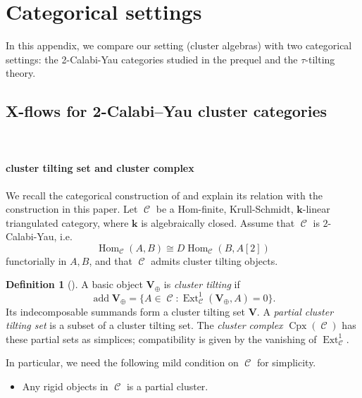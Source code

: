 \documentclass[11pt,reqno]{amsart}
\theoremstyle{plain}
\theoremstyle{definition}
\newtheorem{definition}[theorem]{Definition}
\numberwithin{equation}{section}
\newcommand\hua{\mathcal}
\newcommand\<{\langle}
\renewcommand\>{\rangle}
\newcommand\Add{\operatorname{add}}
\newcommand\Hom{\operatorname{Hom}}
\newcommand\Ext{\operatorname{Ext}}
\newcommand{\C}{\operatorname{\hua{C}}} %
\renewcommand{\k}{\mathbf{k}}
\newcommand{\on}[1]{\operatorname{#1}}
\def\CCx{\on{Cpx}}   %
\def\sink{X}
\newcommand{\pcts}[1]{\mathbf{#1}}%
\newcommand{\pcto}[1]{\mathbf{#1}_\oplus} %
\newcommand{\ccpt}[1]{\mathrm{#1}}%
\def\xevo{\ccpt{X}}%
\begin{document}
\section{Categorical settings}\label{app:cats}
In this appendix, we compare our setting (cluster algebras) with two categorical settings:
the 2-Calabi-Yau categories studied in the prequel and the $\tau$-tilting theory.
\subsection{X-\EVO flows for 2-Calabi--Yau cluster categories}\label{sec:2CY}\

\paragraph{\textbf{cluster tilting set and cluster complex}}

We recall the categorical construction of \cite{QT} and explain its relation with the construction in this paper.
Let $\C$ be a Hom-finite, Krull-Schmidt, $\k$-linear triangulated category,
where $\k$ is algebraically closed. 
Assume that $\C$ is $2$-Calabi-Yau,
i.e.
\[
    \Hom_{\C}(A,B)\cong
    D\Hom_{\C}(B,A[2])
\]
functorially in $A,B$, and that $\C$ admits cluster tilting objects.

\begin{definition}[{\cite[Def.~2.2,~Rem.~2.3~and~Def.~2.5]{QT}}]\label{def:app-cluster}
A basic object $\pcto{V}$ is \emph{cluster tilting} if
\[
    \Add\pcto{V}
    =\{A\in\C:\Ext^1_{\C}(\pcto{V},A)=0\}.
\]
Its indecomposable summands form a cluster tilting set $\pcts{V}$.
A \emph{partial cluster tilting set} is a subset of a cluster tilting set.
The \emph{cluster complex} $\CCx(\C)$ has these partial sets as simplices;
compatibility is given by the vanishing of $\Ext^1_{\C}$.
\end{definition}

In particular, we need the following mild condition on $\C$ for simplicity.
\begin{itemize}
  \item[$\bigstar$] Any rigid objects in $\C$ is a partial cluster.
\end{itemize}
\end{document}
